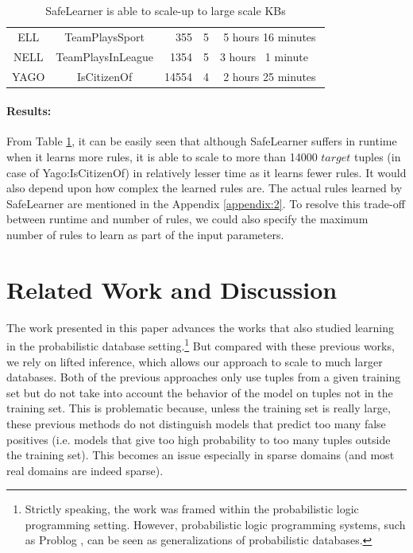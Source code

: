 \documentclass[akbc,twoside,11pt]{article}
\newcommand{\guy}[1]{\textcolor{red}{G: {#1}}}
\newcommand{\algorithmname}{SafeLearner\xspace}
\begin{document}
\begin{table}[H]
\begin{tabular}{|c|c|c|c|c|}
ELL & TeamPlaysSport		& \ \ 355 & 5 & 5 hours 16 minutes \\
NELL & TeamPlaysInLeague	&\ 1354 & 5 & 3 hours \ 1 minute\ \ \\
YAGO & IsCitizenOf          &14554 & 4 & 2 hours 25 minutes \\
\hline
\end{tabular}
\caption{\algorithmname is able to scale-up to large scale KBs}\label{table:scaleup}
\end{table}

\paragraph{Results:} 
From Table \ref{table:scaleup}, it can be easily seen that although \algorithmname suffers in runtime when it learns more rules, it is able to scale to more than 14000 $target$ tuples (in case of Yago:IsCitizenOf) in relatively lesser time as it learns fewer rules. It would also depend upon how complex the learned rules are. The actual rules learned by \algorithmname are mentioned in the Appendix \ref{appendix:2}. To resolve this trade-off between runtime and number of rules, we could also specify the maximum number of rules to learn as part of the input parameters.

\section{Related Work and Discussion}
\label{sec:related}
The work presented in this paper advances the works \cite{DBLP:conf/ijcai/RaedtDTBV15,theobald_learning} that also studied learning in the probabilistic database setting.\footnote{Strictly speaking, the work \cite{DBLP:conf/ijcai/RaedtDTBV15} was framed within the probabilistic logic programming setting. However, probabilistic logic programming systems, such as Problog \cite{fierens2015inference}, can be seen as generalizations of probabilistic databases.} 
But compared with these previous works, we rely on lifted inference, which allows our approach to scale to much larger databases. %
Both of the previous approaches only use tuples from a given training set but do not take into account the behavior of the model on tuples not in the training set. 
This is problematic %
because, unless the training set is really large, these previous methods do not distinguish models that predict too many false positives (i.e. models that give too high probability to too many tuples outside the training set). This becomes an issue especially in sparse domains (and most real domains are indeed sparse).
\end{document}
